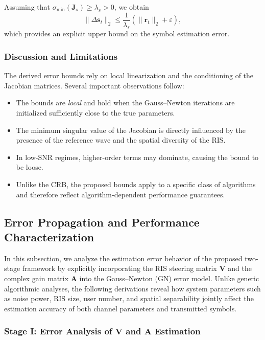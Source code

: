 \documentclass[journal]{IEEEtran}
\begin{document}
Assuming that
$\sigma_{\min}(\mathbf{J}_s) \ge \lambda_s > 0$, we obtain
\begin{equation}
\|\Delta \mathbf{s}_t\|_2
\le
\frac{1}{\lambda_s}
\left(
\|\mathbf{r}_t\|_2
+
\varepsilon
\right),
\label{eq:symbol_error_bound}
\end{equation}
which provides an explicit upper bound on the symbol estimation error.

\subsubsection{Discussion and Limitations}

The derived error bounds rely on local linearization and the conditioning of
the Jacobian matrices.
Several important observations follow:
\begin{itemize}
\item The bounds are \emph{local} and hold when the Gauss--Newton iterations are
initialized sufficiently close to the true parameters.
\item The minimum singular value of the Jacobian is directly influenced by the
presence of the reference wave and the spatial diversity of the RIS.
\item In low-SNR regimes, higher-order terms may dominate, causing the bound to
be loose.
\item Unlike the CRB, the proposed bounds apply to a specific class of
algorithms and therefore reflect algorithm-dependent performance guarantees.
\end{itemize}


\subsection{Error Propagation and Performance Characterization}
\label{subsec:error_analysis}

In this subsection, we analyze the estimation error behavior of the proposed two-stage framework by explicitly incorporating the RIS steering matrix $\mathbf{V}$ and the complex gain matrix $\mathbf{A}$ into the Gauss--Newton (GN) error model. Unlike generic algorithmic analyses, the following derivations reveal how system parameters such as noise power, RIS size, user number, and spatial separability jointly affect the estimation accuracy of both channel parameters and transmitted symbols.

\subsubsection{Stage I: Error Analysis of $\mathbf{V}$ and $\mathbf{A}$ Estimation}
\end{document}
